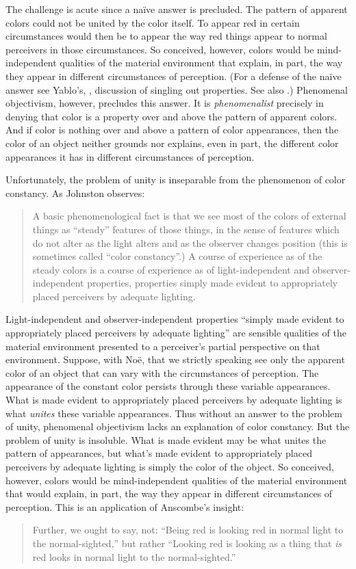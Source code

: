 \documentclass[12pt]{article}
\begin{document}
The challenge is acute since a naïve answer is precluded. The pattern of apparent colors could not be united by the color itself. To appear red in certain circumstances would then be to appear the way red things appear to normal perceivers in those circumstances. So conceived, however, colors would be mind-in\-de\-pen\-dent qualities of the material environment that explain, in part, the way they appear in different circumstances of perception. (For a defense of the naïve answer see Yablo's, \citeyear{Yablo:1995fk}, discussion of singling out properties. See also \citealp{Campbell:1997dq}.) Phenomenal objectivism, however, precludes this answer. It is \emph{phenomenalist} precisely in denying that color is a property over and above the pattern of apparent colors. And if color is nothing over and above a pattern of color appearances, then the color of an object neither grounds nor explains, even in part, the different color appearances it has in different circumstances of perception.

Unfortunately, the problem of unity is inseparable from the phenomenon of color constancy. As Johnston observes: 
	\begin{quote}
		A basic phenomenological fact is that we see most of the colors of external things as ``steady'' features of those things, in the sense of features which do not alter as the light alters and as the observer changes position (this is sometimes called ``color constancy''.) A course of experience as of the steady colors is a course of experience as of light-independent and observer-independent properties, properties simply made evident to appropriately placed perceivers by adequate lighting. \citep[141]{Johnston:1992ck} 
	\end{quote}
Light-independent and observer-independent properties ``simply made evident to appropriately placed perceivers by adequate lighting'' are sensible qualities of the material environment presented to a perceiver's partial perspective on that environment. Suppose, with Noë, that we strictly speaking see only the apparent color of an object that can vary with the circumstances of perception. The appearance of the constant color persists through these variable appearances. What is made evident to appropriately placed perceivers by adequate lighting is what \emph{unites} these variable appearances. Thus without an answer to the problem of unity, phenomenal objectivism lacks an explanation of color constancy. But the problem of unity is insoluble. What is made evident may be what unites the pattern of appearances, but what's made evident to appropriately placed perceivers by adequate lighting is simply the color of the object. So conceived, however, colors would be mind-independent qualities of the material environment that would explain, in part, the way they appear in different circumstances of perception. This is an application of Anscombe's insight: 
	\begin{quote}
		Further, we ought to say, not: ``Being red is looking red in normal light to the normal-sighted,'' but rather ``Looking red is looking as a thing that \emph{is} red looks in normal light to the normal-sighted.'' \citep[14]{Anscombe:1981fk} 
	\end{quote}
\end{document}
